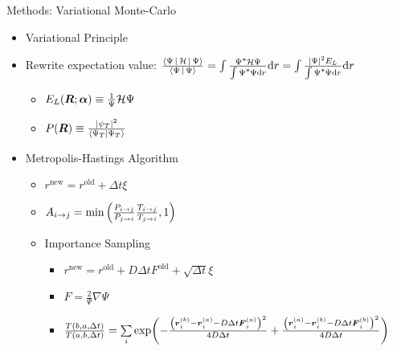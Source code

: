 \documentclass[10pt, t, xcolor=dvipsnames]{beamer}
\begin{document}
{{\begin{frame}[fragile]{Methods: Variational Monte-Carlo}
    \begin{itemize}
        \item Variational Principle
        \item Rewrite expectation value:
            $\frac{\Braket{\Psi|\mathcal{H}|\Psi}}{\Braket{\Psi|\Psi}} = \int
            \frac{\cnj{\Psi}\mathcal{H}\Psi}{\int \cnj{\Psi}\Psi \md r} \md r
            = \int \frac{\abs{\Psi}^2E_L}{\int \cnj{\Psi}\Psi \md r} \md r$
            \begin{itemize}
                \item $E_L(\bm{{R}};\bm{{\alpha}}) \equiv \frac{1}{\Psi}\mathcal{H}\Psi$
                \item $P(\bm{{R}}) \equiv \frac{\abs{\psi_T}^2}{\bra{\Psi_T}\ket{\Psi_T}}$
            \end{itemize}
        \item Metropolis-Hastings Algorithm
            \begin{itemize}
                \item $r^{\text{new}} = r^{\text{old}} + \Delta t \xi$
                \item $A_{i\rightarrow j} =
                    \text{min}\left(\frac{P_{i\rightarrow j}}{P_{j\rightarrow i}}
                    \frac{T_{i\rightarrow j}}{T_{j\rightarrow i}} ,1\right)$
                \item Importance Sampling
                    \begin{itemize}
                        \item $r^{\text{new}} = r^{\text{old}} + D \Delta t
                            F^{\text{old}} + \sqrt{\Delta t}\xi$
                        \item $F = \frac{2}{\Psi}\nabla \Psi$ 
                        \item $\frac{T(b,a,\Delta t)}{T(a,b,\Delta t)} =
                            \sum\limits_i \exp(-\frac{\left(\bm{{r}}^{(b)}_i -
                            \bm{{r}}^{(a)}_i - D\Delta t
                            \bm{{F}}^{(a)}_i\right)^2}{4D\Delta t}
                            +\frac{\left(\bm{{r}}^{(a)}_i - \bm{{r}}^{(b)}_i -
                            D\Delta t \bm{{F}}^{(b)}_i\right)^2}{4D\Delta t})$
                    \end{itemize}
            \end{itemize}
    \end{itemize}
\end{frame}

}}
\end{document}
